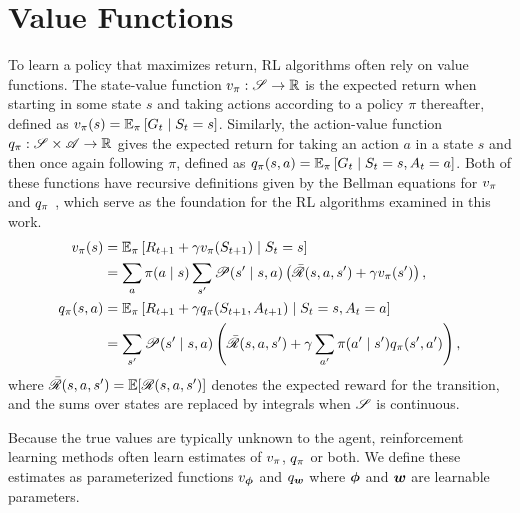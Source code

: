   \section{Value Functions}
  To learn a policy that maximizes return, RL algorithms often rely on value functions. The state-value function $v_{\pi}: \mathscr{S} \to \mathbb{R}$ is the expected return when starting in some state $s$ and taking actions according to a policy $\pi$ thereafter, defined as $v_{\pi}(s) = \mathbb{E}_\pi \left[ G_t \mid S_t = s \right] $. Similarly, the action-value function $q_{\pi}: \mathscr{S} \times \mathscr{A} \to \mathbb{R}$ gives the expected return for taking an action $a$ in a state $s$ and then once again following $\pi$, defined as $ q_{\pi}(s, a) = \mathbb{E}_\pi \left[ G_t \mid S_t = s, A_t = a \right] $. 
  Both of these functions have recursive definitions given by the Bellman equations for $v_{\pi}$ and $q_{\pi}$ , which serve as the foundation for the RL algorithms examined in this work. 
  \begin{align}
      v_{\pi}(s) &= \operatorname{\mathbb{E}}_\pi \left[ R_{t+1} + \gamma v_{\pi}(S_{t+1}) \mid S_t = s \right] \nonumber \\
      &= \sum_{a} \pi(a \mid s) \sum_{s'} \mathscr{P}(s' \mid s, a) \left( \bar{\mathscr{R}}(s, a, s') + \gamma v_{\pi}(s') \right),
      \label{eq:bellman_v} \\
      q_{\pi}(s, a) &= \operatorname{\mathbb{E}}_\pi \left[ R_{t+1} + \gamma q_{\pi}(S_{t+1}, A_{t+1}) \mid S_t = s, A_t = a \right] \nonumber \\
      &= \sum_{s'} \mathscr{P}(s' \mid s, a) \left( \bar{\mathscr{R}}(s, a, s') + \gamma \sum_{a'} \pi(a' \mid s') q_{\pi}(s', a') \right),
      \label{eq:bellman_q}
  \end{align}
  where $\bar{\mathscr{R}}(s, a, s') = \operatorname{\mathbb{E}}[\mathscr{R}(s, a, s')]$ denotes the expected reward for the transition, and the sums over states are replaced by integrals when $\mathscr{S}$ is continuous.
  
  Because the true values are typically unknown to the agent, reinforcement learning methods often learn estimates of $v_{\pi}$, $q_{\pi}$ or both. We define these estimates as parameterized functions $v_{\bm \phi}$ and $q_{\bm w}$ where ${\bm \phi}$ and ${\bm w}$ are learnable parameters. 
  
